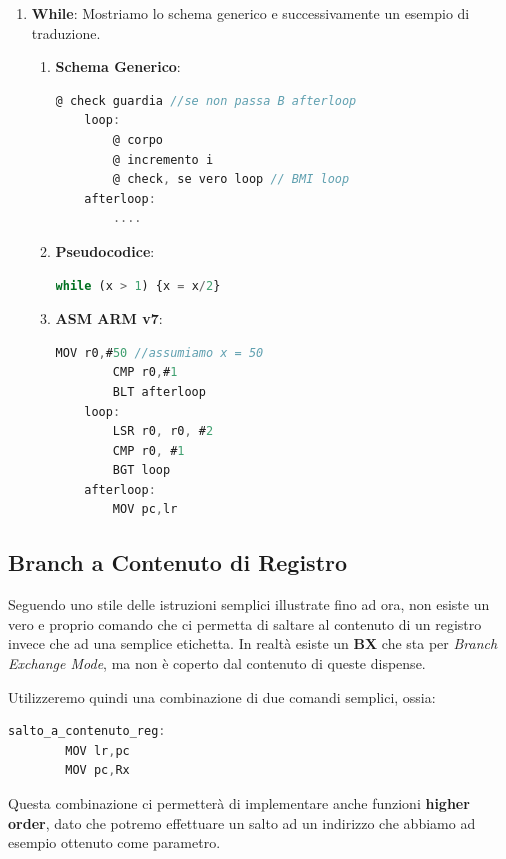 \documentclass{article}
\begin{document}
\begin{enumerate}
\newpage

    \item \textbf{While}: Mostriamo lo schema generico e successivamente un esempio di traduzione.
    \begin{enumerate}
        \item \textbf{Schema Generico}: 
\begin{lstlisting}[language = JavaScript]
        @ check guardia //se non passa B afterloop
    loop:
        @ corpo
        @ incremento i
        @ check, se vero loop // BMI loop
    afterloop:
        ....
\end{lstlisting}
        \item \textbf{Pseudocodice}: 
\begin{lstlisting}[language = JavaScript]
    while (x > 1) {x = x/2}
\end{lstlisting}

        \item \textbf{ASM ARM v7}: 
\begin{lstlisting}[language = JavaScript]
        MOV r0,#50 //assumiamo x = 50
        CMP r0,#1
        BLT afterloop
    loop:
        LSR r0, r0, #2
        CMP r0, #1
        BGT loop
    afterloop:
        MOV pc,lr
\end{lstlisting}
    \end{enumerate}
    
\end{enumerate}

\subsection{Branch a Contenuto di Registro}

Seguendo uno stile delle istruzioni semplici illustrate fino ad ora, non esiste un vero e proprio comando che ci permetta di saltare al contenuto di un registro invece che ad una semplice etichetta. In realtà esiste un \textbf{BX} che sta per \textit{Branch Exchange Mode}, ma non è coperto dal contenuto di queste dispense.

Utilizzeremo quindi una combinazione di due comandi semplici, ossia:

\begin{lstlisting}[language = JavaScript]
    salto_a_contenuto_reg:
        MOV lr,pc
        MOV pc,Rx
\end{lstlisting}

Questa combinazione ci permetterà di implementare anche funzioni \textbf{higher order}, dato che potremo effettuare un salto ad un indirizzo che abbiamo ad esempio ottenuto come parametro.
\end{document}
